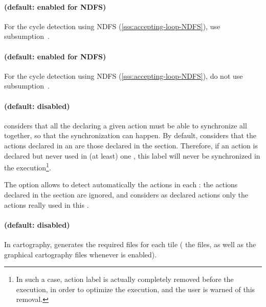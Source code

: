 \paragraph{ (default: enabled for NDFS)}
For the cycle detection using NDFS (\cref{sss:accepting-loop-NDFS}), use subsumption~\cite{NPP18}.


\paragraph{ (default: enabled for NDFS)}
For the cycle detection using NDFS (\cref{sss:accepting-loop-NDFS}), do not use subsumption~\cite{NPP18}.


\paragraph{ (default: disabled)}
\imitator{} considers that all the \IPTA{} declaring a given action must be able to synchronize all together, so that the synchronization can happen.
By default, \imitator{} considers that the actions declared in an \IPTA{} are those declared in the  section.
Therefore, if an action is declared but never used in (at least) one \IPTA{}, this label will never be synchronized in the execution\footnote{In such a case, action label is actually completely removed before the execution, in order to optimize the execution, and the user is warned of this removal.}.

The option  allows to detect automatically the actions in each \IPTA{}: the actions declared in the  section are ignored, and \imitator{} considers as declared actions only the actions really used in this \IPTA{}.



\paragraph{ (default: disabled)}
In cartography, generates the required files for each tile (\ie{} the  files, as well as the graphical cartography files whenever  is enabled).



